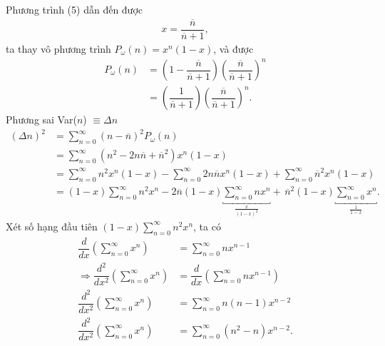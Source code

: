 \documentclass{article}
\newcommand{\f}[2]{\dfrac{#1}{#2}}
\begin{document}
Phương trình (5) dẫn đến được
\begin{align*}
	x = \f{\overline{n}}{\overline{n} + 1},
\end{align*}
ta thay vô phương trình $P_{\omega}(n) = x^{n} (1-x)$, và được
\begin{align*}
	P_{\omega}(n)
	 & = \left(1 - \f{\overline{n}}{\overline{n} + 1}\right) \left(\f{\overline{n}}{\overline{n} + 1}\right)^{n} \\
	 & = \left(\f{1}{\overline{n} + 1}\right)\left(\f{\overline{n}}{\overline{n} + 1}\right)^{n} .
\end{align*}
Phương sai Var($n$) $\equiv \Delta n$
\begin{align*}
	(\Delta n)^2
	 & = \sum_{n = 0}^{\infty}(n - \overline{n})^2 P_{\omega}(n)                                                                                                                                                                  \\
	 & = \sum_{n = 0}^{\infty}(n^2 - 2n\overline{n} + \overline{n}^2) x^{n} (1-x)                                                                                                                                                 \\
	 & = \sum_{n = 0}^{\infty}n^2 x^{n} (1-x) - \sum_{n = 0}^{\infty}2n\overline{n} x^{n} (1-x) + \sum_{n = 0}^{\infty}\overline{n}^2 x^{n} (1-x)                                                                                 \\
	 & = (1-x)\sum_{n = 0}^{\infty}n^2 x^{n} - 2\overline{n}(1-x)\underbracket{\sum_{n = 0}^{\infty}n x^{n}}_{\frac{x}{(1 - x)^2}}  +\, \overline{n}^2(1-x) \underbracket{\sum_{n = 0}^{\infty} x^{n}}_{\frac{1}{1 - x}}. \tag{6}
\end{align*}
Xét số hạng đầu tiên $(1-x)\sum_{n = 0}^{\infty}n^2 x^{n}$, ta có
\begin{align*}
	\f{d}{dx} \left( \sum_{n = 0}^{\infty} x^{n} \right)
	                                                         & = \sum_{n = 0}^{\infty} n x^{n-1}                          \\
	\Rightarrow \f{d^2}{dx^2} \left( \sum_{n = 0}^{\infty} x^{n} \right)
	                                                         & = \f{d}{dx} \left( \sum_{n = 0}^{\infty} n x^{n-1} \right) \\
	\f{d^2}{dx^2} \left( \sum_{n = 0}^{\infty} x^{n} \right) & = \sum_{n = 0}^{\infty} n(n-1) x^{n-2}                     \\
	\f{d^2}{dx^2} \left( \sum_{n = 0}^{\infty} x^{n} \right) & = \sum_{n = 0}^{\infty} (n^2-n) x^{n-2}. \tag{7}
\end{align*}
\end{document}

